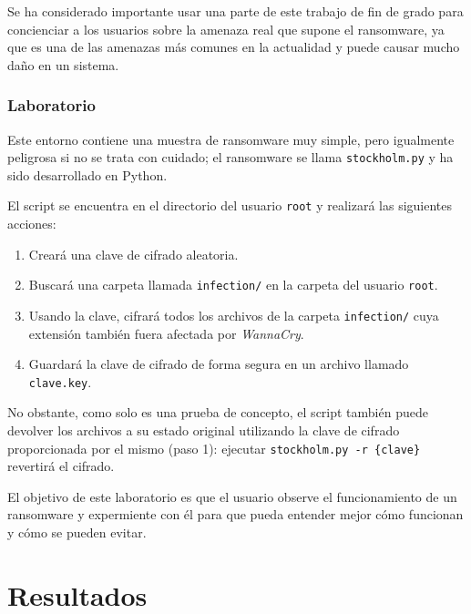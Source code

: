             Se ha considerado importante usar una parte de este trabajo de fin de grado para concienciar a los usuarios sobre la amenaza real que supone el ransomware, ya que es una de las amenazas más comunes en la actualidad y puede causar mucho daño en un sistema.

        \subsection{Laboratorio}

            Este entorno contiene una muestra de ransomware muy simple, pero igualmente peligrosa si no se trata con cuidado; el ransomware se llama \texttt{stockholm.py} y ha sido desarrollado en Python.
            
            El script se encuentra en el directorio del usuario \texttt{root} y realizará las siguientes acciones:
            
            \begin{enumerate}
                \item Creará una clave de cifrado aleatoria.
                \item Buscará una carpeta llamada \texttt{infection/} en la carpeta del usuario \texttt{root}.
                \item Usando la clave, cifrará todos los archivos de la carpeta \texttt{infection/} cuya extensión también fuera afectada por \textit{WannaCry}.
                \item Guardará la clave de cifrado de forma segura en un archivo llamado \texttt{clave.key}.
            \end{enumerate}

            No obstante, como solo es una prueba de concepto, el script también puede devolver los archivos a su estado original utilizando la clave de cifrado proporcionada por el mismo (paso 1): ejecutar \texttt{stockholm.py -r \{clave\}} revertirá el cifrado.
            
            El objetivo de este laboratorio es que el usuario observe el funcionamiento de un ransomware y expermiente con él para que pueda entender mejor cómo funcionan y cómo se pueden evitar.

            \cleardoublepage



\chapter{Resultados}

